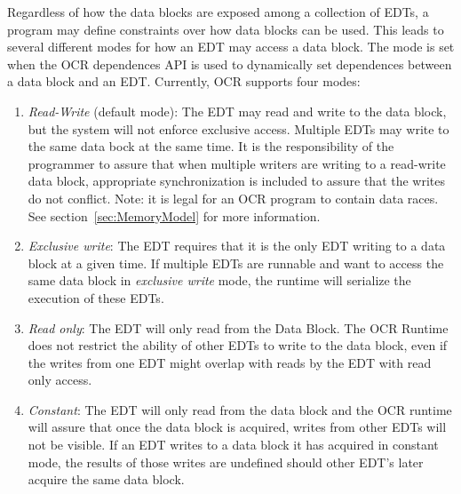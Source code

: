 Regardless of how the data blocks are exposed among a collection of
EDTs, a program may define constraints over how data
blocks can be used.  This leads to several different modes for how an
EDT may access a data block.  The mode is set when the OCR dependences
API is used to dynamically set dependences between a data block and an
EDT. Currently, OCR supports four modes:
\begin{enumerate}

\item \emph{Read-Write} (default mode): The EDT may read
and write to the data block, but the system will not enforce exclusive access.  Multiple EDTs may
write to the same data bock at the same time.   It is the responsibility of the programmer to
assure that when multiple writers are writing to a read-write data block,
appropriate synchronization
is included to assure that the writes do not conflict.  Note: it is legal for an OCR program
to contain data races.  See section~\ref{sec:MemoryModel} for more information.

\item \emph{Exclusive write}: The
EDT requires that it is the only EDT writing to a data block at a
given time. If multiple EDTs are runnable and want to access the same
data block in \emph{exclusive write} mode, the runtime will serialize
the execution of these EDTs.

\item \emph{Read only}: The EDT
will only read from the Data Block. The OCR Runtime does
not restrict the ability of other EDTs to write to the data block,
even if the writes from one EDT might overlap with reads by the EDT
with read only access.

\item \emph{Constant}: The EDT will only read from the
data block and the OCR runtime will assure that once the data block is acquired,
writes from other EDTs will not be visible.  If an EDT writes to a data block
it has acquired in constant mode,
the results of those writes are undefined should other EDT's later acquire the same data block.
\end{enumerate}

